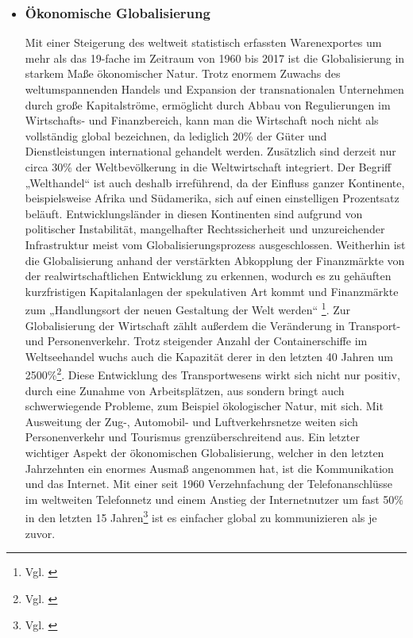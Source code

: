 \documentclass[12pt]{article}
\begin{document}
\begin{itemize}
    \item \subsubsection{Ökonomische Globalisierung}
    Mit einer Steigerung des weltweit statistisch erfassten Warenexportes um mehr als das 19-fache im Zeitraum von 1960 bis 2017 ist die Globalisierung in starkem Maße ökonomischer Natur. Trotz enormem Zuwachs des weltumspannenden Handels und Expansion der transnationalen Unternehmen durch große Kapitalströme, ermöglicht durch Abbau von Regulierungen im Wirtschafts- und Finanzbereich, kann man die Wirtschaft noch nicht als vollständig global bezeichnen, da lediglich 20\% der Güter und Dienstleistungen international gehandelt werden. Zusätzlich sind derzeit nur circa 30\% der Weltbevölkerung in die Weltwirtschaft integriert. Der Begriff „Welthandel“ ist auch deshalb irreführend, da der Einfluss ganzer Kontinente, beispielsweise Afrika und Südamerika, sich auf einen einstelligen Prozentsatz beläuft. Entwicklungsländer in diesen Kontinenten sind aufgrund von politischer Instabilität, mangelhafter Rechtssicherheit und unzureichender Infrastruktur meist vom Globalisierungsprozess ausgeschlossen. Weitherhin ist die Globalisierung anhand der verstärkten Abkopplung der Finanzmärkte von der realwirtschaftlichen Entwicklung zu erkennen, wodurch es zu gehäuften kurzfristigen Kapitalanlagen der spekulativen Art kommt und Finanzmärkte zum „Handlungsort der neuen Gestaltung der Welt werden“ \footnote{Vgl. \cite{Renz2001}}. Zur Globalisierung der Wirtschaft zählt außerdem die Veränderung in Transport- und Personenverkehr. Trotz steigender Anzahl der Containerschiffe im Weltseehandel wuchs auch die Kapazität derer in den letzten 40 Jahren um 2500\%\footnote{Vgl. \cite{Keller2021}}. Diese Entwicklung des Transportwesens wirkt sich nicht nur positiv, durch eine Zunahme von Arbeitsplätzen, aus sondern bringt auch schwerwiegende Probleme, zum Beispiel ökologischer Natur, mit sich. Mit Ausweitung der Zug-, Automobil- und Luftverkehrsnetze weiten sich Personenverkehr und Tourismus grenzüberschreitend aus. Ein letzter wichtiger Aspekt der ökonomischen Globalisierung, welcher in den letzten Jahrzehnten ein enormes Ausmaß angenommen hat, ist die Kommunikation und das Internet. Mit einer seit 1960 Verzehnfachung der Telefonanschlüsse im weltweiten Telefonnetz und einem Anstieg der Internetnutzer um fast 50\% in den letzten 15 Jahren\footnote{Vgl. \cite{Rabe2021}} ist es einfacher global zu kommunizieren als je zuvor.

\end{itemize}
\end{document}
